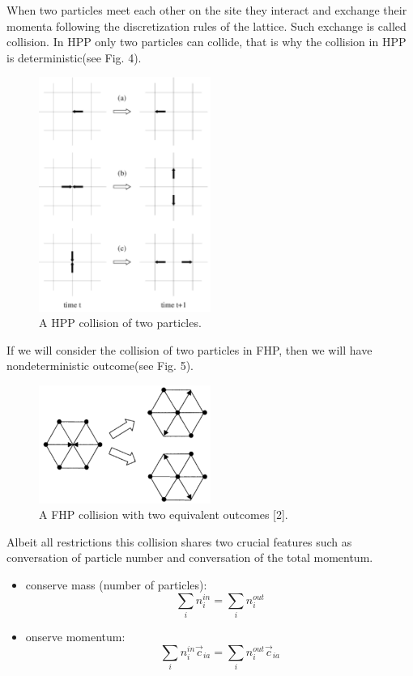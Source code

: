 When two particles meet each other on the site they interact and exchange their momenta following the discretization rules of the lattice. Such exchange is called collision. In HPP only two particles can collide, that is why the collision in HPP is deterministic(see Fig. 4).

\begin{figure}[H]
  \centering
  \includegraphics[width=0.5\textwidth]{img/fig4.png}
  \caption{A HPP collision of two particles.}
\end{figure}

If we will consider the collision of two particles in FHP, then we will have nondeterministic outcome(see Fig. 5).

\begin{figure}[H]
  \centering
  \includegraphics[width=0.5\textwidth]{img/fig5.png}
  \caption{A FHP collision with two equivalent outcomes [2].}
\end{figure}

Albeit all restrictions this collision shares two crucial features such as conversation of particle number and conversation of the total momentum.

\begin{itemize}
\item conserve mass (number of particles):
	\begin{equation}
\sum_i n_i^{in} = \sum_i n_i^{out}
	\end{equation}
\item onserve momentum:
	\begin{equation}
\sum_i n_i^{in} \overrightarrow{c}_{ia} = \sum_i n_i^{out} \overrightarrow{c}_{ia}
	\end{equation}
\end{itemize}

